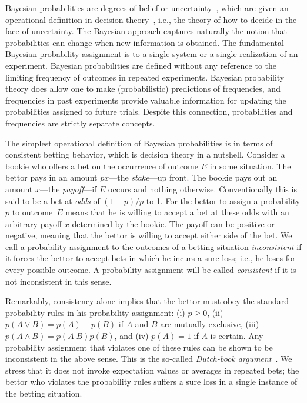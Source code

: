 \documentclass[aps,12pt]{revtex4}
\begin{document}
Bayesian probabilities are degrees of belief or
uncertainty~\cite{BernardoSmith}, which are given an operational
definition in decision theory~\cite{Savage72}, i.e., the theory of
how to decide in the face of uncertainty.  The Bayesian approach
captures naturally the notion that probabilities can change when new
information is obtained.  The fundamental Bayesian probability
assignment is to a single system or a single realization of an
experiment.  Bayesian probabilities are defined without any
reference to the limiting frequency of outcomes in repeated
experiments.  Bayesian probability theory does allow one to make
(probabilistic) predictions of frequencies, and frequencies in past
experiments provide valuable information for updating the
probabilities assigned to future trials. Despite this connection,
probabilities and frequencies are strictly separate concepts.

The simplest operational definition of Bayesian probabilities is in
terms of consistent betting behavior, which is decision theory in a
nutshell.  Consider a bookie who offers a bet on the occurrence of
outcome $E$ in some situation.  The bettor pays in an amount
$px$---the {\it stake\/}---up front. The bookie pays out an amount
$x$---the {\it payoff\/}---if $E$ occurs and nothing otherwise.
Conventionally this is said to be a bet at {\it odds\/} of $(1-p)/p$
to 1.  For the bettor to assign a probability $p$ to outcome~$E$
means that he is willing to accept a bet at these odds with an
arbitrary payoff $x$ determined by the bookie.  The payoff can be
positive or negative, meaning that the bettor is willing to accept
either side of the bet. We call a probability assignment to the
outcomes of a betting situation {\it inconsistent\/} if it forces the
bettor to accept bets in which he incurs a sure loss; i.e., he loses
for every possible outcome.  A probability assignment will be called
{\it consistent\/} if it is not inconsistent in this sense.

Remarkably, consistency alone implies that the bettor must obey the
standard probability rules in his probability assignment: (i)
$p\ge0$, (ii) $p(A\vee B)=p(A)+p(B)$ if $A$ and $B$ are mutually
exclusive, (iii) $p(A\wedge B)=p(A|B)p(B)$, and (iv) $p(A)=1$ if $A$
is certain. Any probability assignment that violates one of these
rules can be shown to be inconsistent in the above sense.  This is
the so-called {\it Dutch-book argument}~\cite{DeFinettiBook,Earman}.
We stress that it does not invoke expectation values or averages in
repeated bets; the bettor who violates the probability rules suffers
a sure loss in a single instance of the betting situation.
\end{document}
